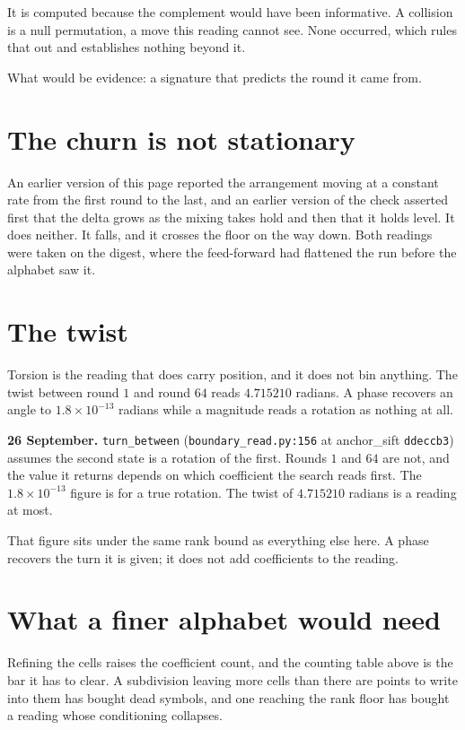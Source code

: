 It is computed because the complement would have been informative. A collision is a null permutation, a move this reading cannot see. None occurred, which rules that out and establishes nothing beyond it.

What would be evidence: a signature that predicts the round it came from.

\section{The churn is not stationary}

An earlier version of this page reported the arrangement moving at a constant rate from the first round to the last, and an earlier version of the check asserted first that the delta grows as the mixing takes hold and then that it holds level. It does neither. It falls, and it crosses the floor on the way down. Both readings were taken on the digest, where the feed-forward had flattened the run before the alphabet saw it.

\section{The twist}

Torsion is the reading that does carry position, and it does not bin anything. The twist between round \(1\) and round \(64\) reads \(4.715210\) radians. A phase recovers an angle to \(1.8 \times 10^{-13}\) radians while a magnitude reads a rotation as nothing at all.

\textbf{26 September.} \texttt{turn\_between} (\texttt{boundary\_read.py:156} at anchor\_sift \texttt{ddeccb3}) assumes the second state is a rotation of the first. Rounds \(1\) and \(64\) are not, and the value it returns depends on which coefficient the search reads first. The \(1.8 \times 10^{-13}\) figure is for a true rotation. The twist of \(4.715210\) radians is a reading at most.

That figure sits under the same rank bound as everything else here. A phase recovers the turn it is given; it does not add coefficients to the reading.

\section{What a finer alphabet would need}

Refining the cells raises the coefficient count, and the counting table above is the bar it has to clear. A subdivision leaving more cells than there are points to write into them has bought dead symbols, and one reaching the rank floor has bought a reading whose conditioning collapses.

